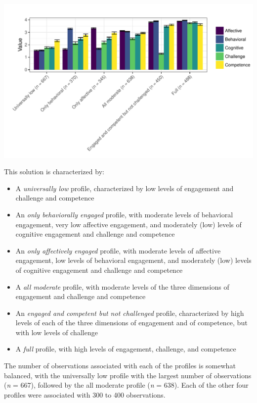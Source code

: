 \documentclass[]{book}
\providecommand{\tightlist}{%
  \setlength{\itemsep}{0pt}\setlength{\parskip}{0pt}}
\theoremstyle{definition}
\theoremstyle{definition}
\theoremstyle{definition}
\theoremstyle{remark}
\begin{document}
\begin{center}\includegraphics[width=1\linewidth]{rosenberg-dissertation_files/figure-latex/unnamed-chunk-10-2} \end{center}

This solution is characterized by:

\begin{itemize}
\tightlist
\item
  A \emph{universally low} profile, characterized by low levels of
  engagement and challenge and competence
\item
  An \emph{only behaviorally engaged} profile, with moderate levels of
  behavioral engagement, very low affective engagement, and moderately
  (low) levels of cognitive engagement and challenge and competence
\item
  An \emph{only affectively engaged} profile, with moderate levels of
  affective engagement, low levels of behavioral engagement, and
  moderately (low) levels of cognitive engagement and challenge and
  competence
\item
  A \emph{all moderate} profile, with moderate levels of the three
  dimensions of engagement and challenge and competence
\item
  An \emph{engaged and competent but not challenged} profile,
  characterized by high levels of each of the three dimensions of
  engagement and of competence, but with low levels of challenge
\item
  A \emph{full} profile, with high levels of engagement, challenge, and
  competence
\end{itemize}

The number of observations associated with each of the profiles is
somewhat balanced, with the universally low profile with the largest
number of observations (\emph{n} = 667), followed by the all moderate
profile (\emph{n} = 638). Each of the other four profiles were
associated with 300 to 400 observations.
\end{document}
